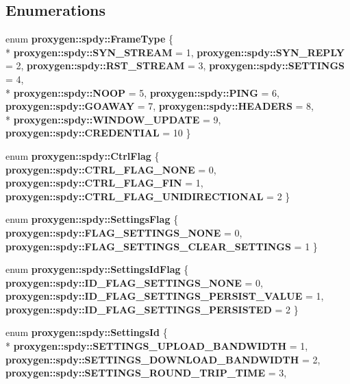 \subsection*{Enumerations}
\begin{DoxyCompactItemize}
\item 
enum {\bf proxygen\+::spdy\+::\+Frame\+Type} \{ \\*
{\bf proxygen\+::spdy\+::\+S\+Y\+N\+\_\+\+S\+T\+R\+E\+AM} = 1, 
{\bf proxygen\+::spdy\+::\+S\+Y\+N\+\_\+\+R\+E\+P\+LY} = 2, 
{\bf proxygen\+::spdy\+::\+R\+S\+T\+\_\+\+S\+T\+R\+E\+AM} = 3, 
{\bf proxygen\+::spdy\+::\+S\+E\+T\+T\+I\+N\+GS} = 4, 
\\*
{\bf proxygen\+::spdy\+::\+N\+O\+OP} = 5, 
{\bf proxygen\+::spdy\+::\+P\+I\+NG} = 6, 
{\bf proxygen\+::spdy\+::\+G\+O\+A\+W\+AY} = 7, 
{\bf proxygen\+::spdy\+::\+H\+E\+A\+D\+E\+RS} = 8, 
\\*
{\bf proxygen\+::spdy\+::\+W\+I\+N\+D\+O\+W\+\_\+\+U\+P\+D\+A\+TE} = 9, 
{\bf proxygen\+::spdy\+::\+C\+R\+E\+D\+E\+N\+T\+I\+AL} = 10
 \}
\item 
enum {\bf proxygen\+::spdy\+::\+Ctrl\+Flag} \{ {\bf proxygen\+::spdy\+::\+C\+T\+R\+L\+\_\+\+F\+L\+A\+G\+\_\+\+N\+O\+NE} = 0, 
{\bf proxygen\+::spdy\+::\+C\+T\+R\+L\+\_\+\+F\+L\+A\+G\+\_\+\+F\+IN} = 1, 
{\bf proxygen\+::spdy\+::\+C\+T\+R\+L\+\_\+\+F\+L\+A\+G\+\_\+\+U\+N\+I\+D\+I\+R\+E\+C\+T\+I\+O\+N\+AL} = 2
 \}
\item 
enum {\bf proxygen\+::spdy\+::\+Settings\+Flag} \{ {\bf proxygen\+::spdy\+::\+F\+L\+A\+G\+\_\+\+S\+E\+T\+T\+I\+N\+G\+S\+\_\+\+N\+O\+NE} = 0, 
{\bf proxygen\+::spdy\+::\+F\+L\+A\+G\+\_\+\+S\+E\+T\+T\+I\+N\+G\+S\+\_\+\+C\+L\+E\+A\+R\+\_\+\+S\+E\+T\+T\+I\+N\+GS} = 1
 \}
\item 
enum {\bf proxygen\+::spdy\+::\+Settings\+Id\+Flag} \{ {\bf proxygen\+::spdy\+::\+I\+D\+\_\+\+F\+L\+A\+G\+\_\+\+S\+E\+T\+T\+I\+N\+G\+S\+\_\+\+N\+O\+NE} = 0, 
{\bf proxygen\+::spdy\+::\+I\+D\+\_\+\+F\+L\+A\+G\+\_\+\+S\+E\+T\+T\+I\+N\+G\+S\+\_\+\+P\+E\+R\+S\+I\+S\+T\+\_\+\+V\+A\+L\+UE} = 1, 
{\bf proxygen\+::spdy\+::\+I\+D\+\_\+\+F\+L\+A\+G\+\_\+\+S\+E\+T\+T\+I\+N\+G\+S\+\_\+\+P\+E\+R\+S\+I\+S\+T\+ED} = 2
 \}
\item 
enum {\bf proxygen\+::spdy\+::\+Settings\+Id} \{ \\*
{\bf proxygen\+::spdy\+::\+S\+E\+T\+T\+I\+N\+G\+S\+\_\+\+U\+P\+L\+O\+A\+D\+\_\+\+B\+A\+N\+D\+W\+I\+D\+TH} = 1, 
{\bf proxygen\+::spdy\+::\+S\+E\+T\+T\+I\+N\+G\+S\+\_\+\+D\+O\+W\+N\+L\+O\+A\+D\+\_\+\+B\+A\+N\+D\+W\+I\+D\+TH} = 2, 
{\bf proxygen\+::spdy\+::\+S\+E\+T\+T\+I\+N\+G\+S\+\_\+\+R\+O\+U\+N\+D\+\_\+\+T\+R\+I\+P\+\_\+\+T\+I\+ME} = 3, 

\end{DoxyCompactItemize}

